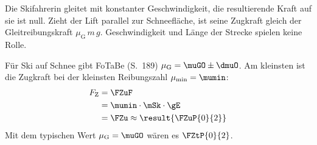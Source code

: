 \begin{center}
\end{center}

Die Skifahrerin gleitet mit konstanter Geschwindigkeit, die resultierende Kraft auf sie ist null. Zieht der Lift parallel zur Schneefläche, ist seine Zugkraft gleich der Gleitreibungskraft $\mu_\mathrm{G}\,m\,g$. Geschwindigkeit und Länge der Strecke spielen keine Rolle.

Für Ski auf Schnee gibt FoTaBe (S.~189) $\mu_\mathrm{G} = \muGO \pm \dmuO$. Am kleinsten ist die Zugkraft bei der kleinsten Reibungszahl $\mu_\mathrm{min} = \mumin$:
\begin{align}
 F_\mathrm{Z} &= \FZuF \\
   &= \mumin\cdot\mSk\cdot\gE \\
   &= \FZu \approx \result{\FZuP{0}{2}}
\end{align}
Mit dem typischen Wert $\mu_\mathrm{G} = \muGO$ wären es $\FZtP{0}{2}$.
